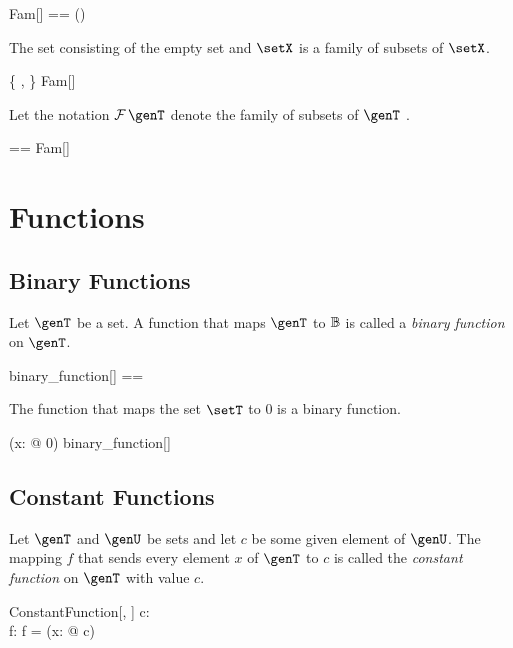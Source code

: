\documentclass{amsart}
\begin{document}
\begin{zed}
	Fam[\genT] == \power(\power \genT)
\end{zed}

\begin{example}
The set consisting of the empty set and $\setX$ is a family of subsets of $\setX$.
\begin{zed}
	\{ \emptyset, \setX \} \in Fam[\setX]
\end{zed}
\end{example}

Let the notation $\Fam \genT$ denote the family of subsets of $\genT$ .

\begin{zed}
	\Fam \genT == Fam[\genT]
\end{zed}

\section{Functions}

\subsection{Binary Functions}

Let $\genT$ be a set. A function that maps $\genT$ to $\mathbb{B}$ is called a \textit{binary function} on $\genT$.

\begin{zed}
	binary\_function[\genT] == \genT \fun \B
\end{zed}

\begin{example}
The function that maps the set $\setT$ to $0$ is a binary function.
\begin{zed}
	(\lambda x: \setT @ 0) \in binary\_function[\setT]
\end{zed}
\end{example}

\subsection{Constant Functions}

Let $\genT$ and $\genU$ be sets and let $c$ be some given element of  $\genU$.
The mapping $f$ that sends every element $x$ of $\genT$ to $c$ is called the \textit{constant function} on $\genT$ with value $c$.

\begin{schema}{ConstantFunction}[\genT, \genU]
	c: \genU \\
	f: \genT \fun \genU
\where
	f = (\lambda x: \genT @ c)
\end{schema}
\end{document}
